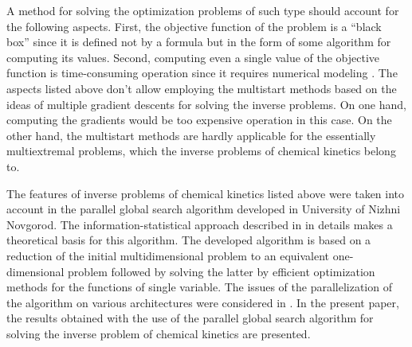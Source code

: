 \documentclass{svproc}
\begin{document}

A method for solving the optimization problems of such type should account for the following aspects. First, the objective function of the problem is a ``black box'' since it is defined not by a formula but in the form of some algorithm for computing its values. Second, computing even a single value of the objective function is time-consuming operation since it requires numerical modeling \cite{Modorskii2016}. The aspects listed above don't allow employing the multistart methods based on the ideas of multiple gradient descents for solving the inverse problems. On one hand, computing the gradients would be too expensive operation in this case. On the other hand, the multistart methods are hardly applicable for the essentially multiextremal problems, which the inverse problems of chemical kinetics belong to.

The features of inverse problems of chemical kinetics listed above were taken into account in the parallel global search algorithm developed in University of Nizhni Novgorod. The information-statistical approach described in \cite{Strongin2000} in details makes a theoretical basis for this algorithm. The developed algorithm is based on a reduction of the initial multidimensional problem to an equivalent one-dimensional problem followed by solving the latter by efficient optimization methods for the functions of single variable. The issues of the parallelization of the algorithm on various architectures were considered in \cite{Barkalov2016,Strongin2018,Barkalov2020}. In the present paper, the results obtained with the use of the parallel global search algorithm for solving the inverse problem of chemical kinetics are presented.
\end{document}
